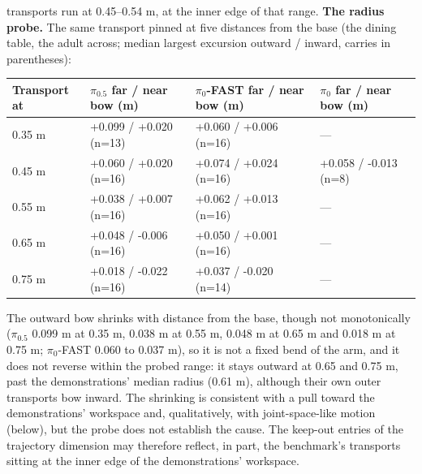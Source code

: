 transports run at 0.45--0.54 m, at the inner edge of that range. \textbf{The radius probe.} The same transport pinned at five distances from the base (the dining table, the adult across; median largest excursion outward / inward, carries in parentheses):

\begin{center}\small
\begin{tabular}{@{}llll@{}}
\toprule
Transport at & $\pi_{0.5}$ far / near bow (m) & $\pi_0$-FAST far / near bow (m) & $\pi_0$ far / near bow (m) \\
\midrule
0.35 m & +0.099 / +0.020 (n=13) & +0.060 / +0.006 (n=16) & --- \\
0.45 m & +0.060 / +0.020 (n=16) & +0.074 / +0.024 (n=16) & +0.058 / -0.013 (n=8) \\
0.55 m & +0.038 / +0.007 (n=16) & +0.062 / +0.013 (n=16) & --- \\
0.65 m & +0.048 / -0.006 (n=16) & +0.050 / +0.001 (n=16) & --- \\
0.75 m & +0.018 / -0.022 (n=16) & +0.037 / -0.020 (n=14) & --- \\
\bottomrule
\end{tabular}
\end{center}

The outward bow shrinks with distance from the base, though not monotonically ($\pi_{0.5}$ 0.099 m at 0.35 m, 0.038 m at 0.55 m, 0.048 m at 0.65 m and 0.018 m at 0.75 m; $\pi_0$-FAST 0.060 to 0.037 m), so it is not a fixed bend of the arm, and it does not reverse within the probed range: it stays outward at 0.65 and 0.75 m, past the demonstrations' median radius (0.61 m), although their own outer transports bow inward. The shrinking is consistent with a pull toward the demonstrations' workspace and, qualitatively, with joint-space-like motion (below), but the probe does not establish the cause. The keep-out entries of the trajectory dimension may therefore reflect, in part, the benchmark's transports sitting at the inner edge of the demonstrations' workspace.

